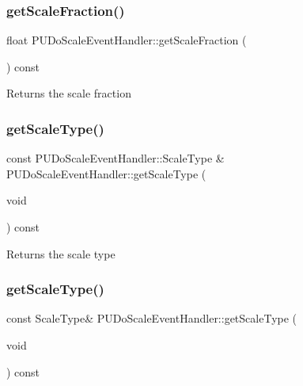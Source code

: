 \subsubsection{\texorpdfstring{get\+Scale\+Fraction()}{getScaleFraction()}\hspace{0.1cm}{\footnotesize\ttfamily [2/2]}}
{\footnotesize\ttfamily float P\+U\+Do\+Scale\+Event\+Handler\+::get\+Scale\+Fraction (\begin{DoxyParamCaption}{ }\end{DoxyParamCaption}) const}

Returns the scale fraction \mbox{\label{classPUDoScaleEventHandler_a01211c36b4d5bd44ad2f41540489db54}} 
\subsubsection{\texorpdfstring{get\+Scale\+Type()}{getScaleType()}\hspace{0.1cm}{\footnotesize\ttfamily [1/2]}}
{\footnotesize\ttfamily const P\+U\+Do\+Scale\+Event\+Handler\+::\+Scale\+Type \& P\+U\+Do\+Scale\+Event\+Handler\+::get\+Scale\+Type (\begin{DoxyParamCaption}\item[{void}]{ }\end{DoxyParamCaption}) const}

Returns the scale type \mbox{\label{classPUDoScaleEventHandler_a65e369cb96be7ad2bc27974c106facf0}} 
\subsubsection{\texorpdfstring{get\+Scale\+Type()}{getScaleType()}\hspace{0.1cm}{\footnotesize\ttfamily [2/2]}}
{\footnotesize\ttfamily const Scale\+Type\& P\+U\+Do\+Scale\+Event\+Handler\+::get\+Scale\+Type (\begin{DoxyParamCaption}\item[{void}]{ }\end{DoxyParamCaption}) const}


